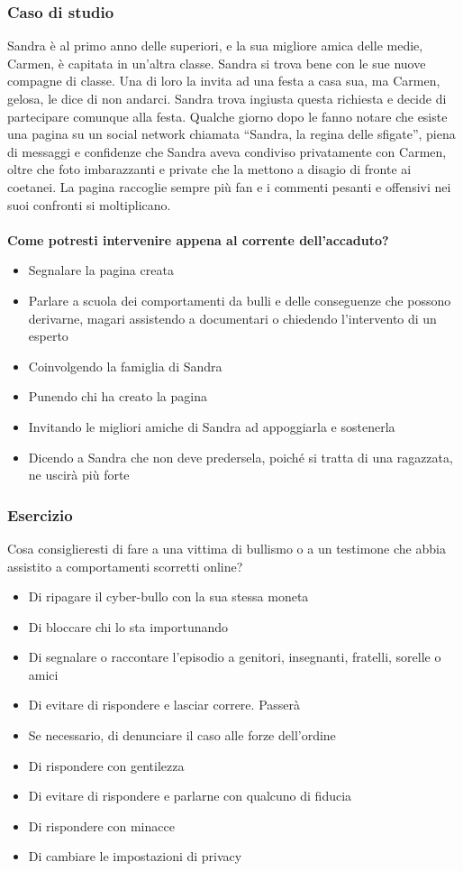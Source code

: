 \documentclass{article}
\begin{document}
\subsubsection{Caso di studio}
\label{sec:Caso17}
Sandra è al primo anno delle superiori, e la sua migliore amica delle medie, Carmen, è capitata in un’altra classe. Sandra si trova bene con le sue nuove compagne di classe. Una di loro la invita ad una festa a casa sua, ma Carmen, gelosa, le dice di non andarci. Sandra trova ingiusta questa richiesta e decide di partecipare comunque alla festa. Qualche giorno dopo le fanno notare che esiste una pagina su un social network chiamata “Sandra, la regina delle sfigate”, piena di messaggi e confidenze che Sandra aveva condiviso privatamente con Carmen, oltre che foto imbarazzanti e private che la mettono a disagio di fronte ai coetanei. La pagina raccoglie sempre più fan e i commenti pesanti e offensivi nei suoi confronti si moltiplicano.
\\\vspace{5mm}\\
\textbf{Come potresti intervenire appena al corrente dell'accaduto?}
\begin{itemize}
	\item Segnalare la pagina creata
	\item Parlare a scuola dei comportamenti da bulli e delle conseguenze che possono derivarne, magari assistendo a documentari o chiedendo l'intervento di un esperto
	\item Coinvolgendo la famiglia di Sandra
	\item Punendo chi ha creato la pagina
	\item Invitando le migliori amiche di Sandra ad appoggiarla e sostenerla
	\item Dicendo a Sandra che non deve predersela, poiché si tratta di una ragazzata, ne uscirà più forte
\end{itemize}
\subsubsection{Esercizio}
\label{sec:Caso18}
Cosa consiglieresti di fare a una vittima di bullismo o a un testimone che abbia assistito a comportamenti scorretti online?
\begin{itemize}
	\item Di ripagare il cyber-bullo con la sua stessa moneta
	\item Di bloccare chi lo sta importunando
	\item Di segnalare o raccontare l'episodio a genitori, insegnanti, fratelli, sorelle o amici
	\item Di evitare di rispondere e lasciar correre. Passerà	
	\item Se necessario, di denunciare il caso alle forze dell’ordine
	\item Di rispondere con gentilezza	
	\item Di evitare di rispondere e parlarne con qualcuno di fiducia
	\item Di rispondere con minacce
	\item Di cambiare le impostazioni di privacy
\end{itemize}
\end{document}
